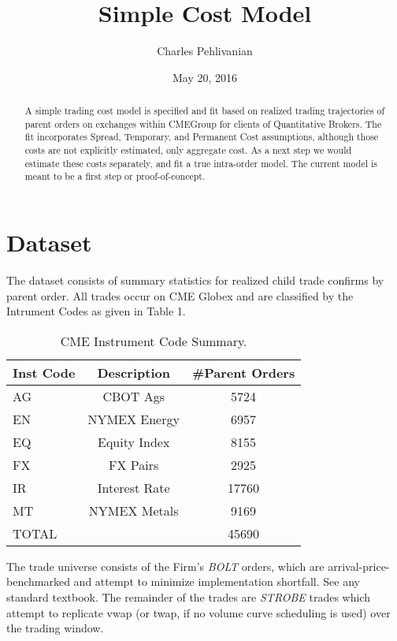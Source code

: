 \documentclass{article}
\begin{document}
\title{Simple Cost Model}
\author{Charles Pehlivanian}
\date{May 20, 2016}

\maketitle

\begin{abstract}

A simple trading cost model is specified and fit based on realized trading trajectories of parent orders on exchanges within CMEGroup for clients of Quantitative Brokers. The fit incorporates Spread, Temporary, and Permanent Cost assumptions, although those costs are not explicitly estimated, only aggregate cost. As a next step we would estimate these costs separately, and fit a true intra-order model. The current model is meant to be a first step or proof-of-concept.

\end{abstract}
\section*{Dataset}

The dataset consists of summary statistics for realized child trade confirms by parent order. All trades occur on CME Globex and are classified by the Intrument Codes as given in Table 1.

\begin{table}
\centering
\begin{tabular}{|l|c|c|}
\hline
Inst Code & Description & \#Parent Orders\\
\hline
AG & CBOT Ags & 5724\\
EN & NYMEX Energy & 6957\\
EQ & Equity Index & 8155\\
FX & FX Pairs & 2925\\
IR & Interest Rate & 17760\\
MT & NYMEX Metals & 9169\\
\hline
\hline
TOTAL & & 45690\\
\hline
\end{tabular}
\caption{CME Instrument Code Summary.}
\label{tab:template}
\end{table}

The trade universe consists of the Firm's {\em BOLT} orders, which are arrival-price-benchmarked and attempt to minimize implementation shortfall. See any standard textbook. The remainder of the trades are {\em STROBE} trades which attempt to replicate vwap (or twap, if no volume curve scheduling is used) over the trading window.
\end{document}
